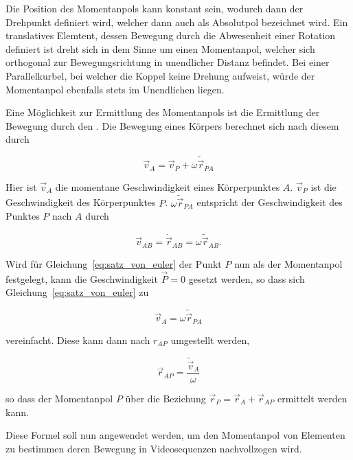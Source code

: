 Die Position des Momentanpols kann konstant sein, wodurch dann der Drehpunkt definiert wird, welcher dann auch als Absolutpol bezeichnet wird.
Ein translatives Elemtent, dessen Bewegung durch die Abwesenheit einer Rotation definiert ist dreht sich in dem Sinne um einen Momentanpol, welcher sich orthogonal zur Bewegungsrichtung in unendlicher Distanz befindet.
Bei einer Parallelkurbel, bei welcher die Koppel keine Drehung aufweist, würde der Momentanpol ebenfalls stets im Unendlichen liegen.

Eine Möglichkeit zur Ermittlung des Momentanpols ist die Ermittlung der Bewegung durch den \cite{Goessner2016}.
Die Bewegung eines Körpers berechnet sich nach diesem durch

\begin{equation}
    \vec{v}_A = \vec{v}_P + \omega \tilde{\vec{r}}_{PA}
    \label{eq:satz_von_euler}
\end{equation} 

Hier ist $\vec{v}_A$ die momentane Geschwindigkeit eines Körperpunktes $A$.
$\vec{v}_P$ ist die Geschwindigkeit des Körperpunktes $P$.
$\omega\tilde{\vec{r}}_{PA}$ entspricht der Geschwindigkeit des Punktes $P$ nach $A$ durch

\begin{equation}
    \vec{v}_{AB} = \dot{\vec{r}}_{AB} = \omega \tilde{\vec{r}}_{AB}.
    \label{eq:absolut_zu_winkel}
\end{equation}

Wird für Gleichung~\ref{eq:satz_von_euler} der Punkt $P$ nun als der Momentanpol festgelegt, kann die Geschwindigkeit $\vec{P} = 0$ gesetzt werden,
so dass sich Gleichung~\ref{eq:satz_von_euler} zu

\begin{equation}
    \vec{v}_A = \omega \tilde{\vec{r}}_{PA}
    \label{eq:satz_von_euler_momentanpol}
\end{equation}

vereinfacht. 
Diese kann dann nach $r_{AP}$ umgestellt werden,

\begin{equation}
    \vec{r}_{AP} = \frac{\tilde{\vec{v}}_A}{\omega}
    \label{eq:euler_rAP}
\end{equation}

so dass der Momentanpol $P$ über die Beziehung $\vec{r}_P = \vec{r}_A + \vec{r}_{AP}$ ermittelt werden kann.

Diese Formel soll nun angewendet werden, um den Momentanpol von Elementen zu bestimmen deren Bewegung in Videosequenzen nachvollzogen wird.

